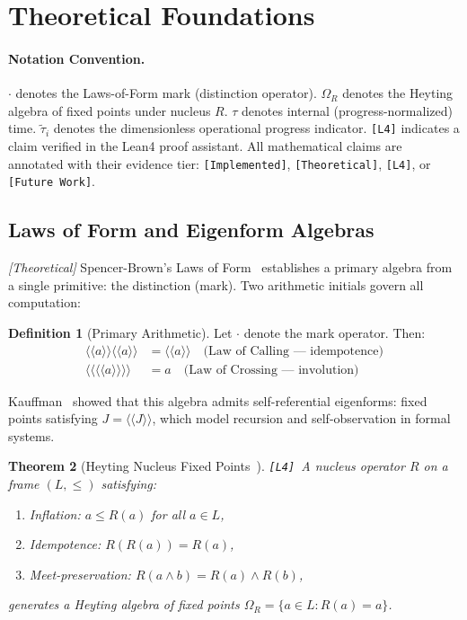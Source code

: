 \documentclass[11pt,a4paper]{article}
\theoremstyle{plain}
\newtheorem{theorem}{Theorem}[section]
\theoremstyle{definition}
\newtheorem{definition}[theorem]{Definition}
\theoremstyle{remark}
\newcommand{\tauhat}{\tilde{\tau}}
\begin{document}
\section{Theoretical Foundations}
\label{sec:theory}

\paragraph{Notation Convention.}
$\cdot$ denotes the Laws-of-Form mark (distinction operator).
$\Omega_R$ denotes the Heyting algebra of fixed points under nucleus $R$.
$\tau$ denotes internal (progress-normalized) time.
$\tauhat_i$ denotes the dimensionless operational progress indicator.
\texttt{[L4\checkmark]} indicates a claim verified in the Lean4 proof assistant.
All mathematical claims are annotated with their evidence tier:
\texttt{[Implemented]}, \texttt{[Theoretical]}, \texttt{[L4\checkmark]}, or \texttt{[Future Work]}.

\subsection{Laws of Form and Eigenform Algebras}

\emph{[Theoretical]} Spencer-Brown's Laws of Form~\cite{spencerbrown1969} establishes a primary
algebra from a single primitive: the distinction (mark).  Two arithmetic initials govern all
computation:

\begin{definition}[Primary Arithmetic]
Let $\cdot$ denote the mark operator. Then:
\begin{align}
  \langle\langle a \rangle\rangle\langle\langle a \rangle\rangle &= \langle\langle a \rangle\rangle
    \quad \text{(Law of Calling --- idempotence)} \label{eq:lof1}\\
  \langle\langle\langle\langle a \rangle\rangle \rangle\rangle &= a
    \quad \text{(Law of Crossing --- involution)} \label{eq:lof2}
\end{align}
\end{definition}

Kauffman~\cite{kauffman1987} showed that this algebra admits self-referential eigenforms: fixed
points satisfying $J = \langle\langle J \rangle\rangle$, which model recursion and
self-observation in formal systems.

\begin{theorem}[Heyting Nucleus Fixed Points~\cite{heyting_nucleus}]
\label{thm:nucleus}
\texttt{[L4\checkmark]}~A nucleus operator $R$ on a frame $(L, \leq)$ satisfying:
\begin{enumerate}
  \item Inflation: $a \leq R(a)$ for all $a \in L$,
  \item Idempotence: $R(R(a)) = R(a)$,
  \item Meet-preservation: $R(a \wedge b) = R(a) \wedge R(b)$,
\end{enumerate}
generates a Heyting algebra of fixed points $\Omega_R = \{a \in L : R(a) = a\}$.
\end{theorem}
\end{document}

